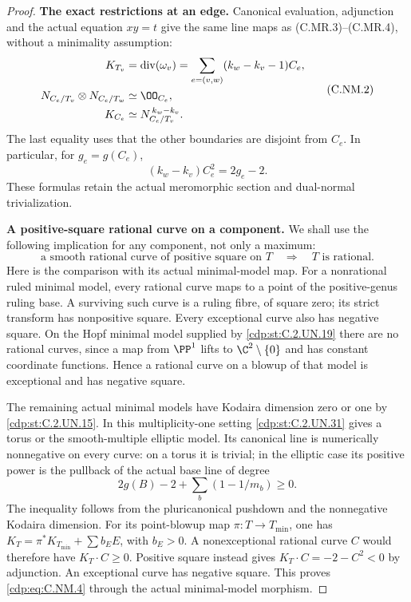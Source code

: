 \begin{proof}
\par\medskip\noindent\textbf{The exact restrictions at an edge.}
Canonical evaluation, adjunction and the actual equation $xy=t$
give the same line maps as (C.MR.3)--(C.MR.4), without a
minimality assumption:
\[
 \begin{split}
 K_{T_v}&=\operatorname{div}(\omega_v)
       =\sum_{e=(v,w)}(k_w-k_v-1)C_e,\\
 N_{C_e/T_v}\otimes N_{C_e/T_w}&\simeq\OO_{C_e},\\
 K_{C_e}&\simeq N_{C_e/T_v}^{\,k_w-k_v}.
 \end{split}
\tag{C.NM.2}\label{cdp:eq:C.NM.2}
\]
The last equality uses that the other boundaries are disjoint
from $C_e$. In particular, for $g_e=g(C_e)$,
\[
                  (k_w-k_v)C_e^2=2g_e-2.
\tag{C.NM.3}\label{cdp:eq:C.NM.3}
\]
These formulas retain the actual meromorphic section and
dual-normal trivialization.

\par\medskip\noindent\textbf{A positive-square rational curve on a component.}
We shall use the following implication for any component, not
only a maximum:
\[
 \text{a smooth rational curve of positive square on }T
                         \quad\Longrightarrow\quad T
                         \text{ is rational}.
\tag{C.NM.4}\label{cdp:eq:C.NM.4}
\]
Here is the comparison with its actual minimal-model map.
For a nonrational ruled minimal model, every rational curve
maps to a point of the positive-genus ruling base. A surviving
such curve is a ruling fibre, of square zero; its strict
transform has nonpositive square. Every exceptional curve
also has negative square. On the Hopf minimal model supplied
by \ref{cdp:st:C.2.UN.19} there are no rational curves, since a map from
$\PP^1$ lifts to $\C^2\setminus\{0\}$ and has constant
coordinate functions. Hence a rational curve on a blowup of
that model is exceptional and has negative square.

The remaining actual minimal models have Kodaira dimension
zero or one by \ref{cdp:st:C.2.UN.15}. In this multiplicity-one setting \ref{cdp:st:C.2.UN.31}
gives a torus or the smooth-multiple elliptic model. Its
canonical line is numerically nonnegative on every curve:
on a torus it is trivial; in the elliptic case its positive
power is the pullback of the actual base line of degree
\[
                   2g(B)-2+\sum_b(1-1/m_b)\ge0.
\tag{C.NM.5}\label{cdp:eq:C.NM.5}
\]
The inequality follows from the pluricanonical pushdown and
the nonnegative Kodaira dimension. For its point-blowup map
$\pi:T\to T_{\min}$, one has
$K_T=\pi^*K_{T_{\min}}+\sum b_EE$, with $b_E>0$.
A nonexceptional rational curve $C$ would therefore have
$K_T\cdot C\ge0$. Positive square instead gives
$K_T\cdot C=-2-C^2<0$ by adjunction. An exceptional curve
has negative square. This proves \eqref{cdp:eq:C.NM.4} through the
actual minimal-model morphism.


\end{proof}
